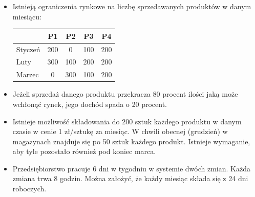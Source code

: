 \begin{itemize}
  \item Istnieją ograniczenia rynkowe na liczbę sprzedawanych produktów w danym miesiącu:
  \begin{center}
  \begin{tabular}{l*{4}{c}}
  	\hline
              			& P1 & P2 & P3 & P4 \\
	\hline
	Styczeń 			& 200 & 0 & 100 & 200 \\
	Luty   				& 300 & 100 & 200 & 200 \\
	Marzec 				& 0 & 300 & 100 & 200  \\
	\hline
	\end{tabular}
	\end{center}
	
	\item Jeżeli sprzedaż danego produktu przekracza 80 procent ilości jaką może wchłonąć rynek, 
    jego dochód spada o 20 procent.
	
	\item Istnieje możliwość składowania do 200 sztuk każdego produktu w danym czasie w cenie 1 zł/sztukę 
    za miesiąc. W chwili obecnej (grudzień) w magazynach znajduje się po 50 sztuk każdego produkt. 
    Istnieje wymaganie, aby tyle pozostało również pod koniec marca.
	
	\item Przedsiębiorstwo pracuje 6 dni w tygodniu w systemie dwóch zmian. Każda zmiana trwa 8 godzin. 
    Można założyć, że każdy miesiąc składa się z 24 dni roboczych.
\end{itemize}

